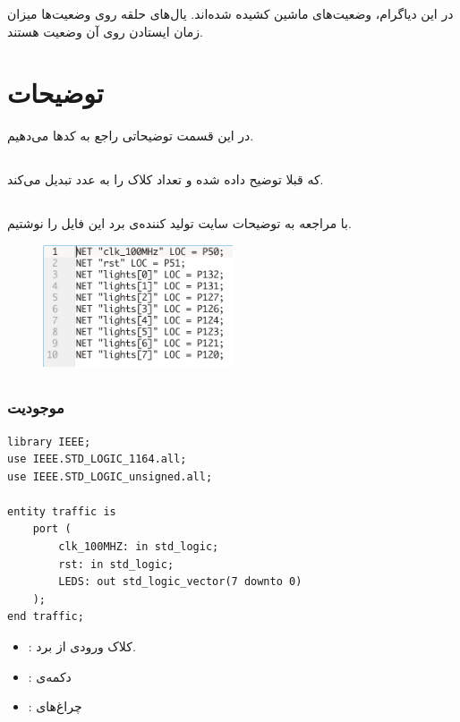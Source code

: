 \documentclass[dvipsnames, svgnames, x11names, a4paper, 11pt]{article}
\begin{document}
در این دیاگرام، وضعیت‌های ماشین کشیده شده‌اند. یال‌های حلقه روی وضعیت‌ها میزان زمان ایستادن روی آن وضعیت هستند.

\section{توضیحات}
در این قسمت توضیحاتی راجع به کد‌ها می‌دهیم.

\subsection{}
که قبلا توضیح داده شده و تعداد کلاک 
را به عدد
تبدیل می‌کند.
\newpage
\subsection{}
با مراجعه به توضیحات سایت تولید کننده‌ی برد این فایل را نوشتیم.
\begin{figure}[H]
\begin{center}
\includegraphics[width=0.5\textwidth, height=0.23\textheight]{./images/ucf}
\end{center}
\end{figure}

\subsection{}
\subsubsection{موجودیت }
\begin{latin}
\begin{lstlisting}
library IEEE;
use IEEE.STD_LOGIC_1164.all;
use IEEE.STD_LOGIC_unsigned.all;

entity traffic is
    port (
        clk_100MHZ: in std_logic;
        rst: in std_logic;
        LEDS: out std_logic_vector(7 downto 0)
    );
end traffic;
\end{lstlisting}
\end{latin}
\begin{itemize}
\item {}:
کلاک ورودی از برد.

\item {}:
دکمه‌ی 

\item {}:
چراغ‌های 
\end{itemize}
\newpage
\end{document}
